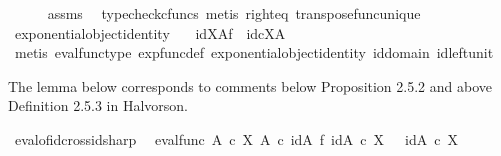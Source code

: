 \begin{isabellebody}
\ \ \ \ \isamarkupfalse%
\ assms\ \isamarkupfalse%
\ {\isacharparenleft}{\kern0pt}typecheck{\isacharunderscore}{\kern0pt}cfuncs{\isacharcomma}{\kern0pt}\ metis\ right{\isacharunderscore}{\kern0pt}eq\ transpose{\isacharunderscore}{\kern0pt}func{\isacharunderscore}{\kern0pt}unique{\isacharparenright}{\kern0pt}\isanewline
{}\isamarkupfalse%
%
\endisatagproof
{\isafoldproof}%
%
\isadelimproof
\isanewline
%
\endisadelimproof
\isanewline
{}\isamarkupfalse%
\ exponential{\isacharunderscore}{\kern0pt}object{\isacharunderscore}{\kern0pt}identity{}{\isacharcolon}{\kern0pt}\ \isanewline
\ \ {\isachardoublequoteopen}id{\isacharparenleft}{\kern0pt}X{\isacharparenright}{\kern0pt}\isactrlbsup A\isactrlesup \isactrlsub f\ {\isacharequal}{\kern0pt}\ id\isactrlsub c{\isacharparenleft}{\kern0pt}X\isactrlbsup A\isactrlesup {\isacharparenright}{\kern0pt}{\isachardoublequoteclose}\isanewline
%
\isadelimproof
\ \ %
\endisadelimproof
%
\isatagproof
{}\isamarkupfalse%
\ {\isacharparenleft}{\kern0pt}metis\ eval{\isacharunderscore}{\kern0pt}func{\isacharunderscore}{\kern0pt}type\ exp{\isacharunderscore}{\kern0pt}func{\isacharunderscore}{\kern0pt}def\ exponential{\isacharunderscore}{\kern0pt}object{\isacharunderscore}{\kern0pt}identity\ id{\isacharunderscore}{\kern0pt}domain\ id{\isacharunderscore}{\kern0pt}left{\isacharunderscore}{\kern0pt}unit{}{\isacharparenright}{\kern0pt}%
\endisatagproof
{\isafoldproof}%
%
\isadelimproof
%
\endisadelimproof
%
\begin{isamarkuptext}%
The lemma below corresponds to comments below Proposition 2.5.2 and above Definition 2.5.3 in Halvorson.%
\end{isamarkuptext}\isamarkuptrue%
\isamarkupfalse%
\ eval{\isacharunderscore}{\kern0pt}of{\isacharunderscore}{\kern0pt}id{\isacharunderscore}{\kern0pt}cross{\isacharunderscore}{\kern0pt}id{\isacharunderscore}{\kern0pt}sharp{}{\isacharcolon}{\kern0pt}\isanewline
\ \ {\isachardoublequoteopen}{\isacharparenleft}{\kern0pt}eval{\isacharunderscore}{\kern0pt}func\ {\isacharparenleft}{\kern0pt}A\ {\isasymtimes}\isactrlsub c\ X{\isacharparenright}{\kern0pt}\ A{\isacharparenright}{\kern0pt}\ {\isasymcirc}\isactrlsub c\ {\isacharparenleft}{\kern0pt}id{\isacharparenleft}{\kern0pt}A{\isacharparenright}{\kern0pt}\ {\isasymtimes}\isactrlsub f\ {\isacharparenleft}{\kern0pt}id{\isacharparenleft}{\kern0pt}A\ {\isasymtimes}\isactrlsub c\ X{\isacharparenright}{\kern0pt}{\isacharparenright}{\kern0pt}\isactrlsup {\isasymsharp}{\isacharparenright}{\kern0pt}\ \ {\isacharequal}{\kern0pt}\ id{\isacharparenleft}{\kern0pt}A\ {\isasymtimes}\isactrlsub c\ X{\isacharparenright}{\kern0pt}{\isachardoublequoteclose}\isanewline

\end{isabellebody}
